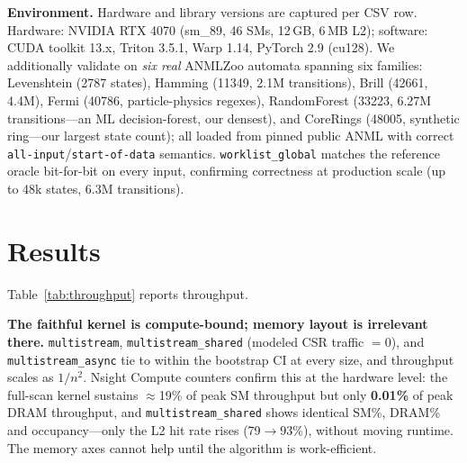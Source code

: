 \documentclass[conference]{IEEEtran}
\begin{document}
\textbf{Environment.} Hardware and library versions are captured per CSV row. Hardware: NVIDIA
RTX 4070 (sm\_89, 46 SMs, 12\,GB, 6\,MB L2); software: CUDA toolkit 13.x, Triton 3.5.1, Warp
1.14, PyTorch 2.9 (cu128). We additionally validate on \emph{six real} ANMLZoo automata
spanning six families: Levenshtein (2787 states), Hamming (11349, 2.1M transitions), Brill
(42661, 4.4M), Fermi (40786, particle-physics regexes), RandomForest (33223, 6.27M
transitions---an ML decision-forest, our densest), and CoreRings (48005, synthetic ring---our
largest state count); all loaded from pinned public ANML with correct
\texttt{all-input}/\texttt{start-of-data} semantics. \texttt{worklist\_global} matches the
reference oracle bit-for-bit on every input, confirming correctness at production scale
(up to 48k states, 6.3M transitions).

\section{Results}\label{sec:results}

\begin{table}[t]
\centering
\caption{Throughput (Gbps) by technique and NFA size (batched, RTX 4070). Dashes:
$>64$ states unsupported by the single-word Triton/Warp kernels.}
\label{tab:throughput}
\small
\setlength{\tabcolsep}{4pt}
\end{table}

Table~\ref{tab:throughput} reports throughput.

\textbf{The faithful kernel is compute-bound; memory layout is irrelevant there.}
\texttt{multistream}, \texttt{multistream\_shared} (modeled CSR traffic $=0$), and
\texttt{multistream\_async} tie to within the bootstrap CI at every size, and throughput
scales as $1/n^2$. Nsight Compute counters confirm this at the hardware level: the full-scan
kernel sustains $\approx$19\% of peak SM throughput but only \textbf{0.01\%} of peak DRAM
throughput, and \texttt{multistream\_shared} shows identical SM\%, DRAM\% and occupancy---only
the L2 hit rate rises (79$\rightarrow$93\%), without moving runtime. The memory axes cannot help
until the algorithm is work-efficient.
\end{document}
